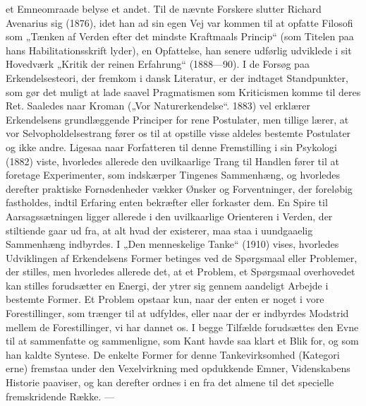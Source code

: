 \documentclass[12pt,a4paper,openany]{book}
\newcommand{\opage}[1]{\marginnote{\footnotesize\textit{[#1]}}}
\begin{document}
et Emneomraade belyse et andet. Til de nævnte Forskere slutter
Richard Avenarius sig (1876), idet han ad sin egen Vej var kommen
til at opfatte Filosofi som „Tænken af Verden efter det mindste
Kraftmaals Princip“ (som Titelen paa hans Habilitationsskrift lyder),
en Opfattelse, han senere udførlig udviklede i sit Hovedværk
 „Kritik der reinen Erfahrung“ (1888---90).
I de Forsøg paa Erkendelsesteori, der fremkom i dansk Literatur,
er der indtaget Standpunkter, som gør det muligt at lade saavel
Pragmatismen som Kriticismen komme til deres Ret. Saaledes naar
Kroman („Vor Naturerkendelse“. 1883) vel erklærer Erkendelsens
grundlæggende Principer for rene Postulater, men tillige lærer, at
vor Selvopholdelsestrang fører os til at opstille visse aldeles bestemte
Postulater og ikke andre. Ligesaa naar Forfatteren til denne Fremstilling
i sin Psykologi (1882) viste, hvorledes allerede den uvilkaarlige
Trang til Handlen fører til at foretage Experimenter, som indskærper
Tingenes Sammenhæng, og hvorledes derefter praktiske
Fornødenheder vækker Ønsker og Forventninger, der foreløbig fastholdes,
indtil Erfaring enten bekræfter eller forkaster dem. En Spire
til Aarsagssætningen ligger allerede i den uvilkaarlige Orienteren i
Verden, der stiltiende gaar ud fra, at alt hvad der existerer, maa staa
i uundgaaelig Sammenhæng indbyrdes. I „Den menneskelige Tanke“
(1910) vises, hvorledes Udviklingen af Erkendelsens Former betinges
ved de Spørgsmaal eller Problemer, der stilles, men hvorledes
allerede det, at et Problem, et Spørgsmaal overhovedet kan stilles
forudsætter en Energi, der ytrer sig gennem aandeligt Arbejde i bestemte
Former. Et Problem opstaar kun, naar der enten er noget i
vore Forestillinger, som trænger til at udfyldes, eller naar der er
indbyrdes Modstrid mellem de Forestillinger, vi har dannet os. I
begge Tilfælde forudsættes den Evne til at sammenfatte og sammenligne,
som Kant havde saa klart et Blik for, og som han kaldte
Syntese. De enkelte Former for denne Tankevirksomhed (Kategori%
\opage{82}erne) fremstaa under den Vexelvirkning med opdukkende Emner,
Videnskabens Historie paaviser, og kan derefter ordnes i en fra det
almene til det specielle fremskridende Række. ---
\end{document}
